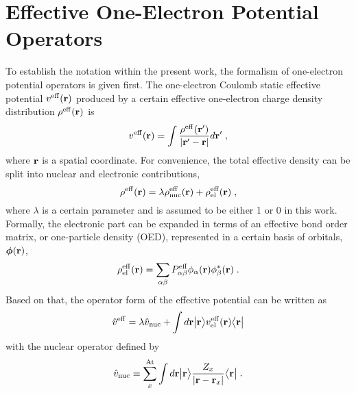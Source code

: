\documentclass[aip,jcp,amsmath,amssymb,reprint,floatfix]{revtex4-1}
\begin{document}
\section{\label{s:2.oep}Effective One-Electron Potential Operators}

To establish the notation within the present work, 
the formalism of one\hyp{}electron potential operators is
given first.
The one\hyp{}electron Coulomb static effective potential $v^{\rm eff}({\bf r})$
produced by a certain effective one\hyp{}electron charge density distribution $\rho^{\rm eff}({\bf r})$
is 
%
\begin{equation} \label{e:v-eff}
	v^{\rm eff}({\bf r}) = \int \frac{ \rho^{\rm eff}({\bf r}') }{ \vert {\bf r}' - {\bf r} \vert} d{\bf r}' \;,
\end{equation}
%
where ${\bf r}$ is a spatial coordinate. 
For convenience, the total effective density can be split into nuclear and electronic contributions,
%
\begin{equation} \label{e:rho-eff}
 \rho^{\rm eff}({\bf r}) = \lambda \rho^{\rm eff}_{\rm nuc}({\bf r}) + \rho^{\rm eff}_{\rm el}({\bf r}) \;,
\end{equation}
%
where $\lambda$ is a certain parameter and is assumed to be either 1 or 0 in this work.
Formally, the electronic part can be expanded in terms of an effective
bond order matrix, or one\hyp{}particle density (OED), represented in a certain basis of orbitals, $\BM{\phi}({\bf r})$,
%
\begin{equation} \label{e:d-spectral}
	\rho^{\rm eff}_{\rm el}({\bf r}) = \sum_{\alpha\beta} P_{\alpha\beta}^{\rm eff} 
	\phi_\alpha({\bf r}) \phi_\beta^{*}({\bf r})  \;.
\end{equation}
%
Based on that, the operator form of the effective potential 
can be written as
%
\begin{equation} \label{e:oep-operator}
	\hat{v}^{\rm eff} = 
        \lambda \hat{v}_{\rm nuc} +
        \int d{\bf r} \Ket{{\bf r}} 
        v^{\rm eff}_{\rm el}({\bf r})
        \Bra{{\bf r}}
\end{equation}
%
with the nuclear
operator
defined by
%
\begin{equation} \label{e:oep-operator-nuc}
        \hat{v}_{\rm nuc} \equiv \sum_x^{\rm At}  
                     \int d{\bf r} \Ket{{\bf r}} 
                     \frac{Z_x}{\vert {\bf r} - {\bf r}_x \vert}
                     \Bra{{\bf r}} \;.
\end{equation}
\end{document}
